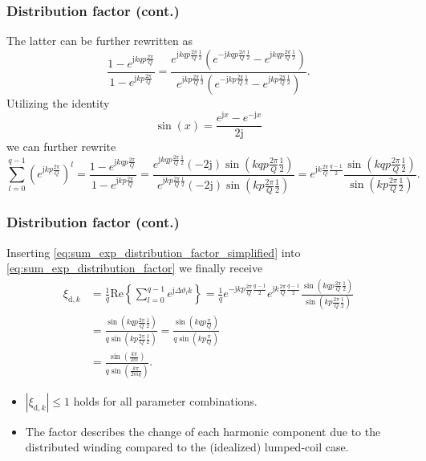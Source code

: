 \begin{frame}
	\frametitle{Distribution factor  (cont.)}
    The latter can be further rewritten as
    $$
    \frac{1-e^{\mathrm{j} k q p\frac{2\pi}{Q}}}{1-e^{\mathrm{j} k p\frac{2\pi}{Q}}} = \frac{e^{\mathrm{j} k q p\frac{2\pi}{Q}\frac{1}{2}}\left(e^{-\mathrm{j} k q p\frac{2\pi}{Q}\frac{1}{2}}-e^{\mathrm{j} k q p\frac{2\pi}{Q}\frac{1}{2}}\right)}{e^{\mathrm{j} k p\frac{2\pi}{Q}\frac{1}{2}}\left(e^{-\mathrm{j} k p\frac{2\pi}{Q}\frac{1}{2}}-e^{\mathrm{j} k p\frac{2\pi}{Q}\frac{1}{2}}\right)}.
    $$
    Utilizing the identity
    $$
    \sin(x) = \frac{e^{\mathrm{j} x}-e^{-\mathrm{j} x}}{2\mathrm{j}}
    $$
    we can further rewrite
    \begin{equation}
        \sum_{l=0}^{q-1} \left(e^{\mathrm{j} k  p\frac{2\pi}{Q}}\right)^l =\frac{1-e^{\mathrm{j} k q p\frac{2\pi}{Q}}}{1-e^{\mathrm{j} k p\frac{2\pi}{Q}}} = \frac{e^{\mathrm{j} k q p\frac{2\pi}{Q}\frac{1}{2}}(-2\mathrm{j})\sin(k q p\frac{2\pi}{Q}\frac{1}{2})}{e^{\mathrm{j} k p\frac{2\pi}{Q}\frac{1}{2}}(-2\mathrm{j})\sin(k p\frac{2\pi}{Q}\frac{1}{2})}=e^{\mathrm{j}k\frac{2 \pi}{Q}\frac{q-1}{2}}\frac{\sin(k q p\frac{2\pi}{Q}\frac{1}{2})}{\sin(k p\frac{2\pi}{Q}\frac{1}{2})}.
        \label{eq:sum_exp_distribution_factor_simplified}
    \end{equation}
\end{frame}

\begin{frame}
	\frametitle{Distribution factor  (cont.)}
    Inserting \eqref{eq:sum_exp_distribution_factor_simplified} into \eqref{eq:sum_exp_distribution_factor} we finally receive
    \begin{equation}
        \begin{split}
        \xi_{\mathrm{d},k} &= \frac{1}{q}\mathrm{Re}\left\{\sum_{l=0}^{q-1} e^{\mathrm{j} \Delta\vartheta_l k}\right\} = \frac{1}{q} e^{- \mathrm{j} k p\frac{2\pi}{Q} \frac{q-1}{2} } e^{\mathrm{j}k\frac{2 \pi}{Q}\frac{q-1}{2}}\frac{\sin(k q p\frac{2\pi}{Q}\frac{1}{2})}{\sin(k p\frac{2\pi}{Q}\frac{1}{2})}\\
            &= \frac{\sin(k q p\frac{2\pi}{Q}\frac{1}{2})}{q\sin(k p\frac{2\pi}{Q}\frac{1}{2})} = \frac{\sin(k q p \frac{\pi}{Q})}{q\sin(k p \frac{\pi}{Q})}\\
            &= \frac{\sin\left(\frac{k \pi}{2 m}\right)}{q\sin\left(\frac{k \pi}{2 m q}\right)}.
    \end{split}
    \end{equation}
    \begin{itemize}
        \item $|\xi_{\mathrm{d},k}| \leq 1$ holds for all parameter combinations.
        \item The factor describes the change of each harmonic component due to the distributed winding compared to the (idealized) lumped-coil case.
    \end{itemize}
\end{frame}

